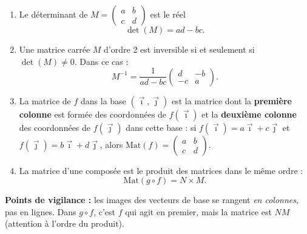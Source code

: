 \documentclass[11pt]{article}
\newcommand{\cle}[1]{{\popxbold\color{popdark}#1}}
\begin{document}
\begin{corrige}
\begin{enumerate}
\item Le \cle{déterminant} de $M=\begin{pmatrix} a & b \\ c & d \end{pmatrix}$ est le réel
\[ \det(M)=ad-bc. \]

\item Une matrice carrée $M$ d'ordre 2 est \cle{inversible} si et seulement si $\det(M)\neq0$. Dans ce cas :
\[ M^{-1}=\frac{1}{ad-bc}\begin{pmatrix} d & -b \\ -c & a \end{pmatrix}. \]

\item La matrice de $f$ dans la base $(\vec{\imath},\vec{\jmath})$ est la matrice dont la \textbf{première colonne} est formée des coordonnées de $f(\vec{\imath})$ et la \textbf{deuxième colonne} des coordonnées de $f(\vec{\jmath})$ dans cette base : si $f(\vec{\imath})=a\vec{\imath}+c\vec{\jmath}$ et $f(\vec{\jmath})=b\vec{\imath}+d\vec{\jmath}$, alors $\mathrm{Mat}(f)=\begin{pmatrix} a & b \\ c & d \end{pmatrix}$.

\item La matrice d'une composée est le produit des matrices dans le même ordre :
\[ \mathrm{Mat}(g\circ f)=N\times M. \]
\end{enumerate}
\textbf{Points de vigilance :} les images des vecteurs de base se rangent \emph{en colonnes}, pas en lignes. Dans $g\circ f$, c'est $f$ qui agit en premier, mais la matrice est $NM$ (attention à l'ordre du produit).
\end{corrige}
\end{document}
